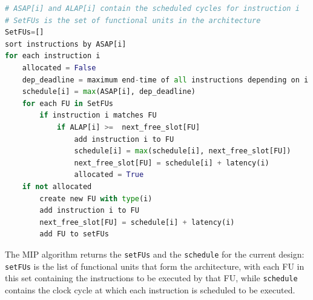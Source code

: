 \begin{lstlisting}[language=Python, caption={\small Modified Interval Partitioning Algorithm}, label={lst:modified_interval_partitioning}, basicstyle=\tiny]
# ASAP[i] and ALAP[i] contain the scheduled cycles for instruction i 
# SetFUs is the set of functional units in the architecture
SetFUs=[]
sort instructions by ASAP[i]
for each instruction i 
	allocated = False
	dep_deadline = maximum end-time of all instructions depending on i 
	schedule[i] = max(ASAP[i], dep_deadline)
	for each FU in SetFUs
		if instruction i matches FU 
			if ALAP[i] >=  next_free_slot[FU]
				add instruction i to FU 
				schedule[i] = max(schedule[i], next_free_slot[FU])
				next_free_slot[FU] = schedule[i] + latency(i)
				allocated = True
	if not allocated
		create new FU with type(i)
		add instruction i to FU 
		next_free_slot[FU] = schedule[i] + latency(i)
		add FU to setFUs 
\end{lstlisting}


The MIP algorithm returns the \verb|setFUs| and the \verb|schedule| for the current design: \verb|setFUs| is the list of functional units that form the architecture, with each FU in this set containing the instructions to be executed by that FU, while \verb|schedule| contains the clock cycle at which each instruction is scheduled to be executed.

